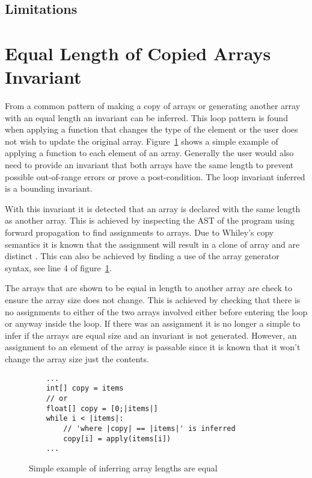\subsection{Limitations}

\section{Equal Length of Copied Arrays Invariant}

From a common pattern of making a copy of arrays or generating another array
with an equal length an invariant can be inferred.
This loop pattern is found when applying a function that changes the type of
the element or the user does not wish to update the original array.
Figure~\ref{lst:whiley-length} shows a simple example of applying a function
 to each element of an array.
Generally the user would also need to provide an invariant that both arrays
have the same length to prevent possible out-of-range errors or prove a
post-condition.
The loop invariant inferred is a bounding invariant.

With this invariant it is detected that an array is declared with the same
length as another array.
This is achieved by inspecting the AST of the program
using forward propagation to find assignments to arrays.
Due to Whiley's copy semantics it is known that the assignment will result
in a clone of array and are distinct \cite{whiley-origin} \cite{whiley-arrays}.
This can also be achieved by finding a use of the array
generator syntax, see line 4 of figure~\ref{lst:whiley-length}.

The arrays that are shown to be equal in length to another array are
check to ensure the array size does not change.
This is achieved by checking that there is no assignments to either
of the two arrays involved either before entering the loop or
anyway inside the loop.
If there was an assignment it is no longer a simple to infer if
the arrays are equal size and an invariant is not generated.
However, an assignment to an element of the array is passable since it
is known that it won't change the array size just the contents.

\begin{figure}[ht]
\begin{lstlisting}
    ...
    int[] copy = items
    // or
    float[] copy = [0;|items|]
    while i < |items|:
        // 'where |copy| == |items|' is inferred
        copy[i] = apply(items[i])
    ...
\end{lstlisting}
\caption{Simple example of inferring array lengths are equal}
\label{lst:whiley-length}
\end{figure}

